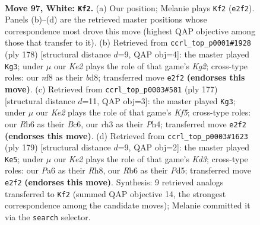 \documentclass[11pt]{article}
\begin{document}
\clearpage

\begin{figure}[p]\centering
\begin{subfigure}{0.46\textwidth}\centering
\resizebox{\linewidth}{!}{%
\newchessgame
\chessboard[
  setfen={5n2/3k4/PR6/8/8/7r/4K3/8 w - - 21 97},
  showmover=false,
  pgfstyle=straightmove, color=movearrow, markmove={e2-f2}
]}
\caption{}
\end{subfigure}\hfill
\begin{subfigure}{0.46\textwidth}\centering
\resizebox{\linewidth}{!}{%
\newchessgame
\chessboard[
  setfen={3b4/R7/P4k2/8/7r/8/6K1/8 w - - 0 90},
  showmover=false,
  pgfstyle=straightmove, color=movearrow, markmove={g2-g3}
]}
\caption{}
\end{subfigure}
\\[4pt]
\begin{subfigure}{0.46\textwidth}\centering
\resizebox{\linewidth}{!}{%
\newchessgame
\chessboard[
  setfen={8/8/2b5/8/5k1p/8/P3K3/6N1 b - - 7 89},
  showmover=false,
  pgfstyle=straightmove, color=movearrow, markmove={f4-g3}
]}
\caption{}
\end{subfigure}\hfill
\begin{subfigure}{0.46\textwidth}\centering
\resizebox{\linewidth}{!}{%
\newchessgame
\chessboard[
  setfen={7r/8/3k4/3p4/8/2P5/2N5/4K3 b - - 89 90},
  showmover=false,
  pgfstyle=straightmove, color=movearrow, markmove={d6-e5}
]}
\caption{}
\end{subfigure}
\caption{\textbf{Move 97, White: \texttt{Kf2}.} (a) Our position; Melanie plays \texttt{Kf2} (\texttt{e2f2}). Panels (b)--(d) are the retrieved master positions whose correspondence most drove this move (highest QAP objective among those that transfer to it). (b) Retrieved from \texttt{ccrl\_top\_p0001\#1928} (ply 178) [structural distance $d$=9, QAP obj=4]: the master played \texttt{Kg3}; under $\mu$ our \emph{Ke2} plays the role of that game's \emph{Kg2}; cross-type roles: our \emph{n}f8 as their \emph{b}d8; transferred move \texttt{e2f2} \textbf{(endorses this move)}. (c) Retrieved from \texttt{ccrl\_top\_p0003\#581} (ply 177) [structural distance $d$=11, QAP obj=3]: the master played \texttt{Kg3}; under $\mu$ our \emph{Ke2} plays the role of that game's \emph{Kf5}; cross-type roles: our \emph{R}b6 as their \emph{B}c6, our \emph{r}h3 as their \emph{P}h4; transferred move \texttt{e2f2} \textbf{(endorses this move)}. (d) Retrieved from \texttt{ccrl\_top\_p0003\#1623} (ply 179) [structural distance $d$=9, QAP obj=2]: the master played \texttt{Ke5}; under $\mu$ our \emph{Ke2} plays the role of that game's \emph{Kd3}; cross-type roles: our \emph{P}a6 as their \emph{R}h8, our \emph{R}b6 as their \emph{P}d5; transferred move \texttt{e2f2} \textbf{(endorses this move)}. Synthesis: 9 retrieved analogs transferred to \texttt{Kf2} (summed QAP objective 14, the strongest correspondence among the candidate moves); Melanie committed it via the \texttt{search} selector.}
\label{fig:thought-m192}
\end{figure}
\end{document}
